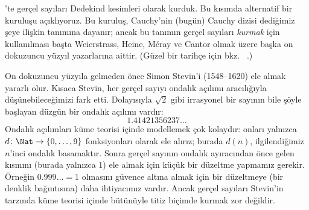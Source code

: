 



'te gerçel sayıları Dedekind kesimleri olarak kurduk. Bu
kısımda alternatif bir kuruluşu açıklıyoruz. Bu kuruluş, Cauchy'nin (bugün)
Cauchy dizisi dediğimiz şeye ilişkin tanımına dayanır; ancak bu tanımın gerçel
sayıları \emph{kurmak} için kullanılması başta Weierstrass, Heine, M\'{e}ray
ve Cantor olmak üzere başka on dokuzuncu yüzyıl yazarlarına aittir. (Güzel
bir tarihçe için bkz.\ \citeauthor{OConnorRobertson:RN}
\citeyear{OConnorRobertson:RN}.)

On dokuzuncu yüzyıla gelmeden önce Simon Stevin'i (1548--1620) ele almak
yararlı olur. Kısaca Stevin, her gerçel sayıyı ondalık açılımı aracılığıyla
düşünebileceğimizi fark etti. Dolayısıyla $\sqrt{2}$ gibi irrasyonel bir
sayının bile şöyle başlayan düzgün bir ondalık açılımı vardır:
\[
	1.41421356237\ldots
\]
Ondalık açılımları küme teorisi içinde modellemek çok kolaydır: onları
yalnızca $d \colon \Nat \to \{0,\ldots,9\}$ fonksiyonları olarak ele alırız; burada
$d(n)$, ilgilendiğimiz $n$'inci ondalık basamaktır. Sonra gerçel sayının ondalık
ayıracından önce gelen kısmını (burada yalnızca $1$) ele almak için küçük bir
düzeltme yapmamız gerekir. Örneğin $0.999\ldots = 1$ olmasını güvence altına
almak için bir düzeltmeye (bir denklik bağıntısına) daha ihtiyacımız vardır.
Ancak gerçel sayıları Stevin'in tarzında küme teorisi içinde bütünüyle titiz
biçimde kurmak zor değildir.

